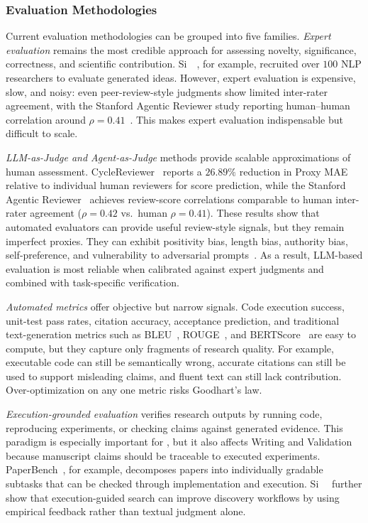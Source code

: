 \subsubsection{Evaluation Methodologies}
\label{sec:eval_methods}

Current evaluation methodologies can be grouped into five families. \emph{Expert evaluation} remains the most credible approach for assessing novelty, significance, correctness, and scientific contribution. Si~\etal~\cite{si2024ideas}, for example, recruited over $100$ NLP researchers to evaluate generated ideas. However, expert evaluation is expensive, slow, and noisy: even peer-review-style judgments show limited inter-rater agreement, with the Stanford Agentic Reviewer study reporting human--human correlation around $\rho=0.41$~\cite{stanfordreviewer2025}. This makes expert evaluation indispensable but difficult to scale.

\emph{LLM-as-Judge and Agent-as-Judge} methods provide scalable approximations of human assessment. CycleReviewer~\cite{cycleresearcher2024} reports a $26.89\%$ reduction in Proxy MAE relative to individual human reviewers for score prediction, while the Stanford Agentic Reviewer~\cite{stanfordreviewer2025} achieves review-score correlations comparable to human inter-rater agreement ($\rho=0.42$ vs.\ human $\rho=0.41$). These results show that automated evaluators can provide useful review-style signals, but they remain imperfect proxies. They can exhibit positivity bias, length bias, authority bias, self-preference, and vulnerability to adversarial prompts~\cite{llmreviewer2025,ye2024llmjudgebias}. As a result, LLM-based evaluation is most reliable when calibrated against expert judgments and combined with task-specific verification.

\emph{Automated metrics} offer objective but narrow signals. Code execution success, unit-test pass rates, citation accuracy, acceptance prediction, and traditional text-generation metrics such as BLEU~\cite{papineni2002bleu}, ROUGE~\cite{lin2004rouge}, and BERTScore~\cite{zhang2020bertscore} are easy to compute, but they capture only fragments of research quality. For example, executable code can still be semantically wrong, accurate citations can still be used to support misleading claims, and fluent text can still lack contribution. Over-optimization on any one metric risks Goodhart's law.

\emph{Execution-grounded evaluation} verifies research outputs by running code, reproducing experiments, or checking claims against generated evidence. This paradigm is especially important for \Sthree, but it also affects Writing and Validation because manuscript claims should be traceable to executed experiments. PaperBench~\cite{paperbench2025}, for example, decomposes papers into individually gradable subtasks that can be checked through implementation and execution. Si~\etal~\cite{si2026executiongrounded} further show that execution-guided search can improve discovery workflows by using empirical feedback rather than textual judgment alone.

